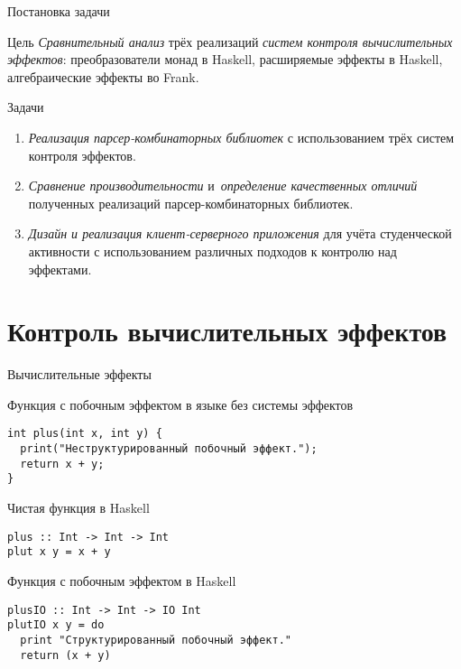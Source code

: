 \begin{frame}[fragile]{Постановка задачи}
\begin{block}{Цель}
\emph{Сравнительный анализ} трёх реализаций \emph{систем контроля вычислительных эффектов}: преобразователи монад в Haskell, расширяемые эффекты в Haskell, алгебраические эффекты во Frank.
\end{block}
\begin{block}{Задачи}
\begin{enumerate}
\item \emph{Реализация парсер-комбинаторных библиотек} с использованием трёх
      систем контроля эффектов.
\item \emph{Сравнение производительности} и~\emph{определение качественных отличий} полученных
      реализаций парсер-комбинаторных библиотек.
\item \emph{Дизайн и реализация клиент-серверного приложения} для учёта студенческой
      активности с использованием различных подходов к контролю над эффектами.
\end{enumerate}
\end{block}
\end{frame}

\section{Контроль вычислительных эффектов}

\begin{frame}[fragile]{Вычислительные эффекты}
  \begin{block}{Функция с побочным эффектом в языке без системы эффектов}
  \begin{verbatim}
int plus(int x, int y) {
  print("Неструктурированный побочный эффект.");
  return x + y;
}
  \end{verbatim}
  \end{block}
  \begin{block}{Чистая функция в Haskell}
  \begin{verbatim}
plus :: Int -> Int -> Int
plut x y = x + y
  \end{verbatim}
  \end{block}
  \begin{block}{Функция с побочным эффектом в Haskell}
  \begin{verbatim}
plusIO :: Int -> Int -> IO Int
plutIO x y = do
  print "Структурированный побочный эффект."
  return (x + y)
  \end{verbatim}
  \end{block}
\end{frame}

